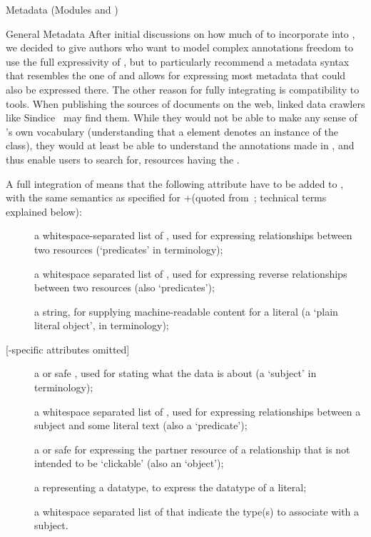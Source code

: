 \begin{tchapter}[id=metadata,short=Metadata]{Metadata (Modules {} and  {})}
\begin{tsection}{General Metadata}
After initial discussions on how much of \rdfa to incorporate into \omdoc, we decided to give authors who want to model complex annotations freedom to use the full expressivity of \rdfa, but to particularly recommend a metadata syntax that resembles the one of  and allows for expressing most metadata that could also be expressed there. The other reason for fully integrating \rdfa is compatibility to \rdfa tools.  When publishing the sources of \omdoc documents on the web, linked data crawlers like Sindice~\cite{TumDelOre:Sindice07} may find them.  While they would not be able to make any sense of \omdoc's own \xml vocabulary (\eg understanding that a  element denotes an instance of the  class), they would at least be able to understand the annotations made in \rdfa, and thus enable users to search for,  \eg[,] \omdoc resources having the  .

A full integration of \rdfa means that the following attribute have to be added to \omdoc, with the same semantics as specified for \xhtml+\rdfa (quoted from~\cite{AdidaEtAl08:RDFa}; technical terms explained below):

\begin{description}
\item[] a whitespace-separated list of \curies, used for expressing relationships between two resources (\enquote*{predicates} in \rdf terminology);
\item[] a whitespace separated list of \curies, used for expressing reverse relationships between two resources (also \enquote*{predicates});
\item[] a string, for supplying machine-readable content for a literal (a \enquote*{plain literal object}, in \rdf terminology);
\item[\textmd{[\xhtml-specific attributes omitted]}]
\item[] a \uri or safe \curie, used for stating what the data is about (a \enquote*{subject} in \rdf terminology);
\item[] a whitespace separated list of \curies, used for expressing relationships between a subject and some literal text (also a \enquote*{predicate});
\item[] a \uri or safe \curie for expressing the partner resource of a relationship that is not intended to be \enquote*{clickable} (also an \enquote*{object});
\item[] a \curie representing a datatype, to express the datatype of a literal;
\item[] a whitespace separated list of \curies that indicate the \rdf   type(s) to associate with a subject.
\end{description}


\end{tsection}
\end{tchapter}

